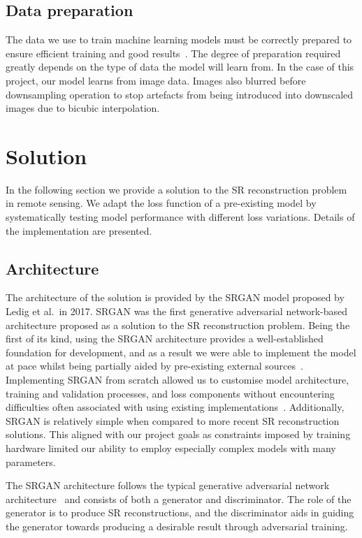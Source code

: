 \subsection{Data preparation}\label{subsec:data_preparation}
The data we use to train machine learning models must be correctly prepared to ensure efficient training and good results~\cite{ref}. The degree of preparation required greatly depends on the type of data the model will learn from. In the case of this project, our model learns from image data. Images also blurred before downsampling operation to stop artefacts from being introduced into downscaled images due to bicubic interpolation.

\section{Solution}
In the following section we provide a solution to the SR reconstruction problem in remote sensing. We adapt the loss function of a pre-existing model by systematically testing model performance with different loss variations. Details of the implementation are presented.

\subsection{Architecture}
The architecture of the solution is provided by the SRGAN model proposed by Ledig et al.\ in 2017. SRGAN was the first generative adversarial network-based architecture proposed as a solution to the SR reconstruction problem. Being the first of its kind, using the SRGAN architecture provides a well-established foundation for development, and as a result we were able to implement the model at pace whilst being partially aided by pre-existing external sources~\cite{ref}. Implementing SRGAN from scratch allowed us to customise model architecture, training and validation processes, and loss components without encountering difficulties often associated with using existing implementations~\cite{ref}. Additionally, SRGAN is relatively simple when compared to more recent SR reconstruction solutions. This aligned with our project goals as constraints imposed by training hardware limited our ability to employ especially complex models with many parameters.

The SRGAN architecture follows the typical generative adversarial network architecture~\cite{ref} and consists of both a generator and discriminator. The role of the generator is to produce SR reconstructions, and the discriminator aids in guiding the generator towards producing a desirable result through adversarial training.

